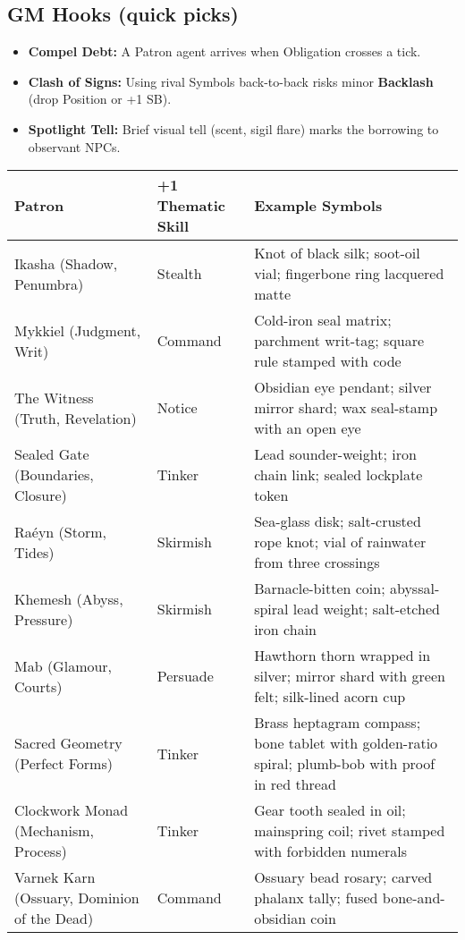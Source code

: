 \subsection*{GM Hooks (quick picks)}
\begin{itemize}
  \item \textbf{Compel Debt:} A Patron agent arrives when Obligation crosses a tick.
  \item \textbf{Clash of Signs:} Using rival Symbols back-to-back risks minor \textbf{Backlash} (drop Position or +1 SB).
  \item \textbf{Spotlight Tell:} Brief visual tell (scent, sigil flare) marks the borrowing to observant NPCs.
\end{itemize}

\begin{table}[H]
\centering
\renewcommand{\arraystretch}{1.15}
\begin{tabular}{@{}p{3.8cm}p{3.8cm}p{7.5cm}@{}}
\toprule
\textbf{Patron} & \textbf{+1 Thematic Skill} & \textbf{Example Symbols} \\
\midrule
Ikasha (Shadow, Penumbra) & Stealth & Knot of black silk; soot-oil vial; fingerbone ring lacquered matte \\
Mykkiel (Judgment, Writ) & Command & Cold-iron seal matrix; parchment writ-tag; square rule stamped with code \\
The Witness (Truth, Revelation) & Notice & Obsidian eye pendant; silver mirror shard; wax seal-stamp with an open eye \\
Sealed Gate (Boundaries, Closure) & Tinker & Lead sounder-weight; iron chain link; sealed lockplate token \\
Raéyn (Storm, Tides) & Skirmish & Sea-glass disk; salt-crusted rope knot; vial of rainwater from three crossings \\
Khemesh (Abyss, Pressure) & Skirmish & Barnacle-bitten coin; abyssal-spiral lead weight; salt-etched iron chain \\
Mab (Glamour, Courts) & Persuade & Hawthorn thorn wrapped in silver; mirror shard with green felt; silk-lined acorn cup \\
Sacred Geometry (Perfect Forms) & Tinker & Brass heptagram compass; bone tablet with golden-ratio spiral; plumb-bob with proof in red thread \\
Clockwork Monad (Mechanism, Process) & Tinker & Gear tooth sealed in oil; mainspring coil; rivet stamped with forbidden numerals \\
Varnek Karn (Ossuary, Dominion of the Dead) & Command & Ossuary bead rosary; carved phalanx tally; fused bone-and-obsidian coin \\

\end{tabular}
\end{table}
